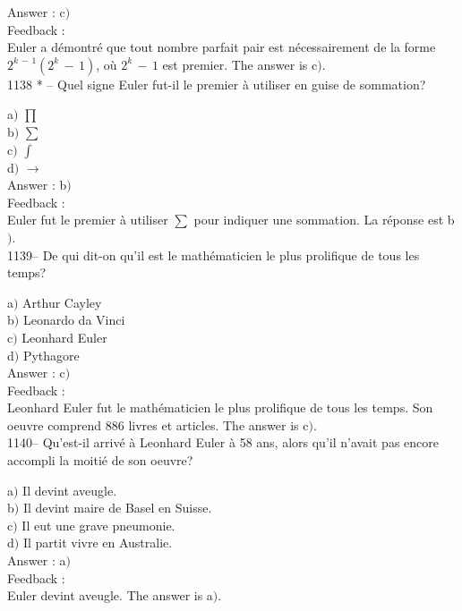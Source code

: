 ﻿\documentclass[letterpaper, 12pt]{article}
\begin{document}
Answer : c$)$\\

Feedback : \\
Euler a d\'emontr\'e que tout nombre parfait pair est
n\'ecessairement de la forme $2^{k\,-\,1}(2^k\,-\,1)$, o\`u
$2^k\,-\,1$ est premier.
The answer is c$)$.\\

1138 * -- Quel signe Euler fut-il le premier \`a utiliser en guise
de sommation?

a$)$ $\prod$ \\[1mm]
b$)$ $\sum$  \\[1mm]
c$)$ $\int$   \\[1mm]
d$)$ $\to$  \\

Answer : b$)$\\

Feedback : \\
Euler fut le premier \`a utiliser $\sum$ pour indiquer une sommation. La
r\'eponse est b$)$. \\

1139-- De qui dit-on qu'il est le math\'ematicien le plus prolifique
de tous les temps?

a$)$ Arthur Cayley \\
b$)$ Leonardo da Vinci  \\
c$)$ Leonhard Euler   \\
d$)$ Pythagore  \\

Answer : c$)$\\

Feedback : \\
Leonhard Euler fut le math\'ematicien le plus prolifique de tous les temps.
Son oeuvre comprend 886 livres et articles. The answer is c$)$. \\

1140-- Qu'est-il arriv\'e \`a Leonhard Euler \`a 58 ans, alors qu'il
n'avait pas encore accompli la moiti\'e de son oeuvre?

a$)$ Il devint aveugle. \\
b$)$ Il devint maire de Basel en Suisse.   \\
c$)$ Il eut une grave pneumonie.   \\
d$)$ Il partit vivre en Australie.  \\

Answer : a$)$\\

Feedback : \\
Euler devint aveugle. The answer is a$)$. \\
\end{document}
